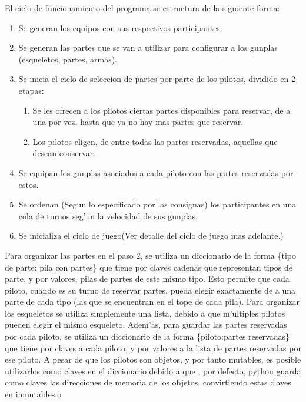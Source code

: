 \documentclass[12pt]{article}
\begin{document}
		El ciclo de funcionamiento del programa se estructura de la siguiente forma:

		\begin{enumerate}
			\item Se generan los equipos con sus respectivos participantes. 
			\item Se generan las partes que se van a utilizar para configurar a los gunplas (esqueletos, partes, armas).
			\item Se inicia el ciclo de seleccion de partes por parte de los pilotos, dividido en 2 etapas:
			\begin{enumerate}
				\item Se les ofrecen a los pilotos ciertas partes disponibles para reservar, de a una por vez, hasta que ya no hay mas partes que reservar.
				\item Los pilotos eligen, de entre todas las partes reservadas, aquellas que desean conservar.
			\end{enumerate}
			\item Se equipan los gunplas asociados a cada piloto con las partes reservadas por estos.
			\item Se ordenan (Segun lo especificado por las consignas) los participantes en una cola de turnos seg'un la velocidad
			de sus gunplas.
			\item Se inicializa el ciclo de juego(Ver detalle del ciclo de juego mas adelante.)
		\end{enumerate}

		Para organizar las partes en el paso $2$, se utiliza un diccionario de la forma \{tipo de parte: pila con partes\} que tiene por claves 
		cadenas que representan tipos de parte, y por valores, pilas de partes de este mismo tipo. Esto permite que cada piloto, cuando es su turno de reservar partes, pueda elegir exactamente de a una parte de cada tipo (las que se encuentran en el tope de cada pila). Para organizar los esqueletos se utiliza simplemente una lista, debido a que m'ultiples pilotos pueden elegir el mismo esqueleto. 
		Adem'as, para guardar las partes reservadas por cada piloto, se utiliza un diccionario de la forma \{piloto:partes reservadas\}
		que tiene por claves a cada piloto, y por valores a la lista de partes reservadas por ese piloto. A pesar de que los pilotos son objetos, y por tanto mutables, es posible utilizarlos como claves en el diccionario debido a que , por defecto, python guarda como claves las direcciones de memoria de los objetos, convirtiendo estas claves en inmutables.o
\end{document}
